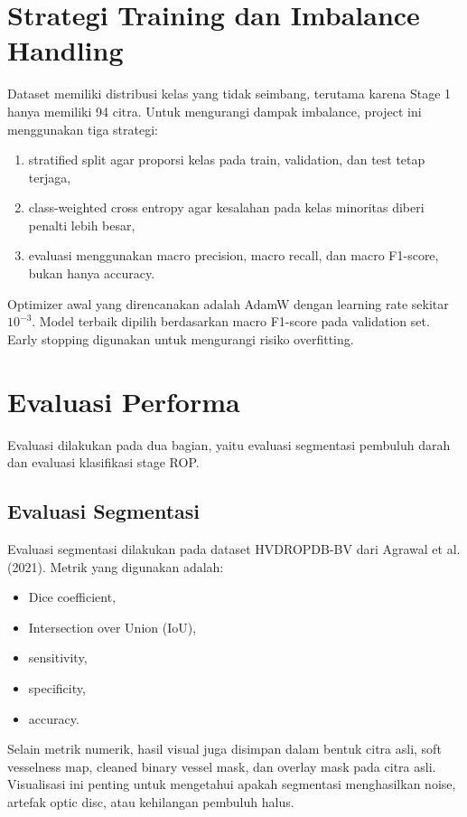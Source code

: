 \documentclass[12pt,a4paper]{article}
\begin{document}
\section*{Strategi Training dan Imbalance Handling}

Dataset memiliki distribusi kelas yang tidak seimbang, terutama karena Stage 1 hanya memiliki 94 citra. Untuk mengurangi dampak imbalance, project ini menggunakan tiga strategi:

\begin{enumerate}[label=\alph*.]
  \item stratified split agar proporsi kelas pada train, validation, dan test tetap terjaga,
  \item class-weighted cross entropy agar kesalahan pada kelas minoritas diberi penalti lebih besar,
  \item evaluasi menggunakan macro precision, macro recall, dan macro F1-score, bukan hanya accuracy.
\end{enumerate}

Optimizer awal yang direncanakan adalah AdamW dengan learning rate sekitar \(10^{-3}\). Model terbaik dipilih berdasarkan macro F1-score pada validation set. Early stopping digunakan untuk mengurangi risiko overfitting.

\section*{Evaluasi Performa}

Evaluasi dilakukan pada dua bagian, yaitu evaluasi segmentasi pembuluh darah dan evaluasi klasifikasi stage ROP.

\subsection*{Evaluasi Segmentasi}

Evaluasi segmentasi dilakukan pada dataset HVDROPDB-BV dari Agrawal et al. (2021). Metrik yang digunakan adalah:

\begin{itemize}
  \item Dice coefficient,
  \item Intersection over Union (IoU),
  \item sensitivity,
  \item specificity,
  \item accuracy.
\end{itemize}

Selain metrik numerik, hasil visual juga disimpan dalam bentuk citra asli, soft vesselness map, cleaned binary vessel mask, dan overlay mask pada citra asli. Visualisasi ini penting untuk mengetahui apakah segmentasi menghasilkan noise, artefak optic disc, atau kehilangan pembuluh halus.
\end{document}
